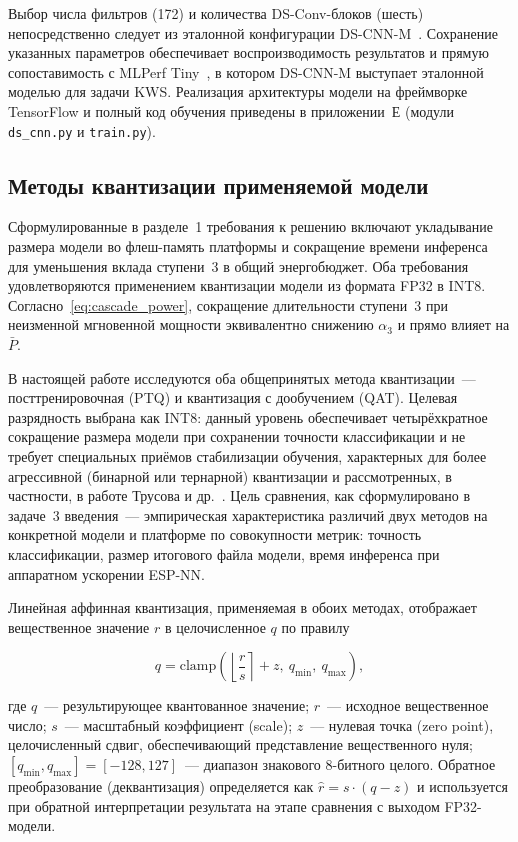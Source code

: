 Выбор числа фильтров (172) и количества DS-Conv-блоков (шесть)
непосредственно следует из эталонной конфигурации
DS-CNN-M~\cite{src:1}. Сохранение указанных параметров обеспечивает
воспроизводимость результатов и прямую сопоставимость с MLPerf
Tiny~\cite{src:5}, в котором DS-CNN-M выступает эталонной моделью для
задачи KWS. Реализация архитектуры модели на фреймворке TensorFlow и
полный код обучения приведены в приложении~Е (модули
\texttt{ds\_cnn.py} и \texttt{train.py}).

\subsection{Методы квантизации применяемой модели}

Сформулированные в разделе~1 требования к решению включают укладывание
размера модели во флеш-память платформы и сокращение времени инференса
для уменьшения вклада ступени~3 в общий энергобюджет. Оба требования
удовлетворяются применением квантизации модели из формата FP32 в INT8.
Согласно~\eqref{eq:cascade_power}, сокращение длительности ступени~3 при
неизменной мгновенной мощности эквивалентно снижению $\alpha_3$ и
прямо влияет на $\bar{P}$.

В настоящей работе исследуются оба общепринятых метода квантизации~---
посттренировочная (PTQ) и квантизация с дообучением (QAT). Целевая
разрядность выбрана как INT8: данный уровень обеспечивает
четырёхкратное сокращение размера модели при сохранении точности
классификации и не требует специальных приёмов стабилизации обучения,
характерных для более агрессивной (бинарной или тернарной) квантизации
и рассмотренных, в частности, в работе Трусова и др.~\cite{src:32}.
Цель сравнения, как сформулировано в задаче~3 введения~--- эмпирическая
характеристика различий двух методов на конкретной модели и платформе
по совокупности метрик: точность классификации, размер итогового
файла модели, время инференса при аппаратном ускорении ESP-NN.

Линейная аффинная квантизация, применяемая в обоих методах, отображает
вещественное значение $r$ в целочисленное $q$ по правилу

\begin{equation}
	q = \mathrm{clamp}\!\left(\left\lfloor \frac{r}{s} \right\rceil + z,\ q_{\min},\ q_{\max}\right),
	\label{eq:quant_forward}
\end{equation}

где $q$~--- результирующее квантованное значение; $r$~--- исходное
вещественное число; $s$~--- масштабный коэффициент (scale); $z$~---
нулевая точка (zero point), целочисленный сдвиг, обеспечивающий
представление вещественного нуля; $[q_{\min}, q_{\max}] = [-128, 127]$~---
диапазон знакового 8-битного целого. Обратное преобразование
(деквантизация) определяется как $\hat{r} = s \cdot (q - z)$ и
используется при обратной интерпретации результата на этапе
сравнения с выходом FP32-модели.

